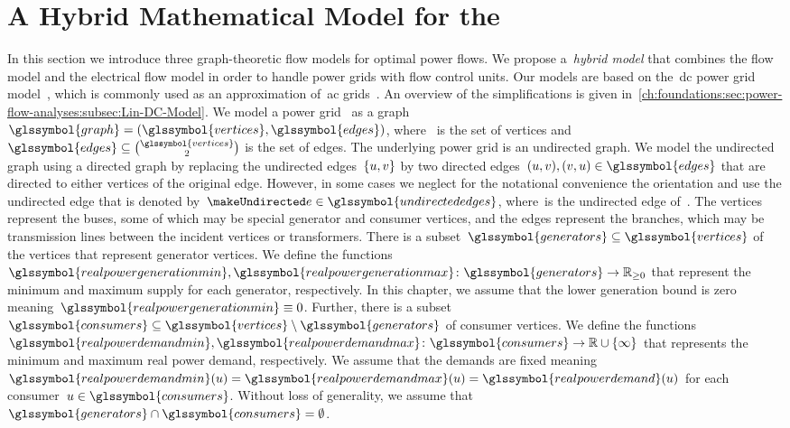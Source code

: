 \section[A Hybrid Mathematical Model for the Placement of Continuous Control Units]{
A Hybrid Mathematical Model for the \protect{}} 
% 
\label{ch:facts:sec:model} 
%
In this section we introduce three graph-theoretic flow models for optimal power
flows. We propose a~\emph{hybrid model} that combines the flow model and the
electrical flow model in order to handle power grids with flow control units.
Our models are based on the~\gls{dc} power grid model~\parencite{Ham07,
Zimmerman2011a,sja-dcpfr-09}, which is commonly used as an approximation
of~\gls{ac} grids~\parencite{Pur05,ocs-acdc-04}. An overview of the
simplifications is given
in~\cref{ch:foundations:sec:power-flow-analyses:subsec:Lin-DC-Model}. We model a
power grid~ as a graph~$\glssymbol{graph} =
(\glssymbol{vertices}, \glssymbol{edges})$, where~ is the
set of vertices and~$\glssymbol{edges}\subseteq \binom{\glssymbol{vertices}}{2}$
is the set of edges. The underlying power grid is an undirected graph. We model
the undirected graph using a directed graph by replacing the undirected edges~$
\{u,v\}$ by two directed
edges~$(\vertexa,\vertexb),(\vertexb,\vertexa)\in\glssymbol{edges}$ that are
directed to either vertices of the original edge. However, in some cases we
neglect for the notational convenience the orientation and use the undirected
edge that is denoted by~$\undirectededge\in\glssymbol{undirectededges}$,
where~\undirectededge is the undirected edge of~\edge. The vertices represent
the buses, some of which may be special generator and consumer vertices, and the
edges represent the branches, which may be transmission lines between the
incident vertices or transformers. There is a
subset~$\glssymbol{generators}\subseteq\glssymbol{vertices}$ of the vertices
that represent generator vertices. We define the
functions~$\glssymbol{realpowergenerationmin},\glssymbol{realpowergenerationmax}\colon\glssymbol{generators}\to\posreals$
that represent the minimum and maximum supply for each generator, respectively.
In this chapter, we assume that the lower generation bound is zero
meaning~$\glssymbol{realpowergenerationmin}\equiv 0$. Further, there is a
subset~$\glssymbol{consumers} \subseteq \glssymbol{vertices} \setminus
\glssymbol{generators}$ of consumer vertices. We define the
functions~$
\glssymbol{realpowerdemandmin},
\glssymbol{realpowerdemandmax}
\colon
\glssymbol{consumers}
\to
\reals
\cup
\{\infty\}$ that represents the minimum and maximum real power demand,
respectively. We assume that the demands are fixed
meaning~$\glssymbol{realpowerdemandmin}(\vertexa) =
\glssymbol{realpowerdemandmax}(\vertexa) =
\glssymbol{realpowerdemand}(\vertexa)$ for each consumer~$\vertexa \in
\glssymbol{consumers}$. Without loss of generality, we assume
that~$\glssymbol{generators}\cap\glssymbol{consumers} = \emptyset$.
% 
